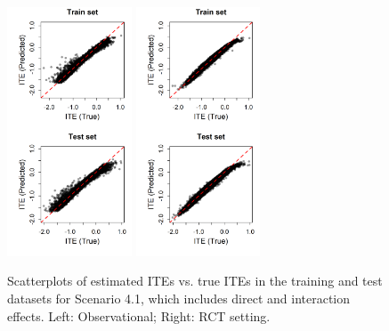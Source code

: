 \begin{figure}[htbp]
\centering
\includegraphics[width=0.33\textwidth]{img/results/observ_scenario1_ITE_scatter_train_test.png} 
\includegraphics[width=0.33\textwidth]{img/results/rct_scenario1_ITE_scatter_train_test.png}
\vspace{-17pt}
\caption{Scatterplots of estimated ITEs vs. true ITEs in the training and test datasets for Scenario 4.1, which includes direct and interaction effects. Left: Observational; Right: RCT setting.}
\label{fig:scenario1_ite_scatter_train_test}
\end{figure}



% 


